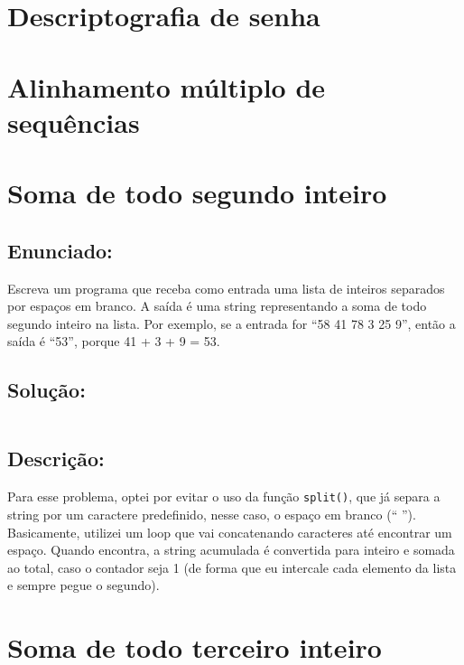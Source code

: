 \documentclass[9pt,a4paper,twocolumn,twoside]{tau-class/tau}
\begin{document}
\section{Descriptografia de senha}
\section{Alinhamento múltiplo de sequências}
\section{Soma de todo segundo inteiro}

    \subsection{Enunciado:}

        \begin{tauenv}[frametitle = Soma de todo segundo inteiro.]
                Escreva um programa que receba como entrada uma lista de inteiros separados por espaços em
                branco. A saída é uma string representando a soma de todo segundo inteiro na lista. Por exemplo,
                se a entrada for ``58 41 78 3 25 9'', então a saída é ``53'', porque 41 + 3 + 9 = 53.
        \end{tauenv}

    \subsection{Solução:}

        \inputminted{python}{src/4/4.py}

    \subsection{Descrição:}

        Para esse problema, optei por evitar o uso da função \texttt{split()}, que já separa a string por um caractere predefinido, nesse caso, o espaço em branco (`` ''). Basicamente, utilizei um loop que vai concatenando caracteres até encontrar um espaço. Quando encontra, a string acumulada é convertida para inteiro e somada ao total, caso o contador seja 1 (de forma que eu intercale cada elemento da lista e sempre pegue o segundo).
	
\section{Soma de todo terceiro inteiro}
\end{document}
